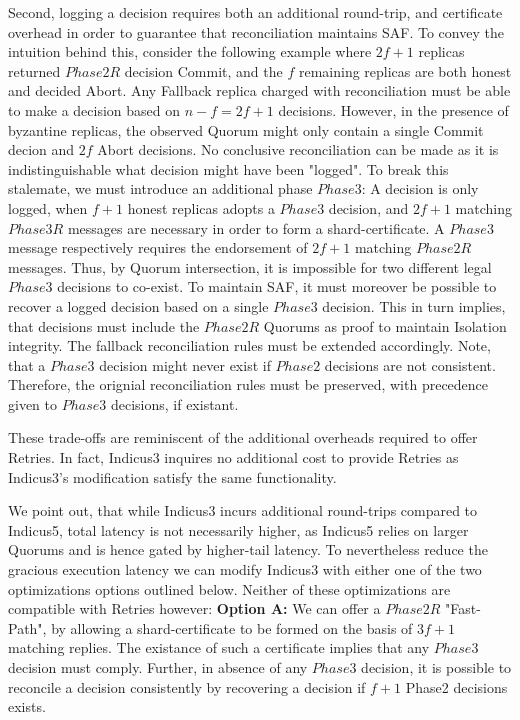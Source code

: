 Second, logging a decision requires both an additional round-trip, and certificate overhead in order to guarantee that reconciliation maintains SAF. To convey the intuition behind this, consider the following example where $2f+1$ replicas returned $Phase2R$ decision Commit, and the $f$ remaining replicas are both honest and decided Abort. Any Fallback replica charged with reconciliation must be able to make a decision based on $n-f = 2f+1$ decisions. However, in the presence of byzantine replicas, the observed Quorum might only contain a single Commit decion and $2f$ Abort decisions. No conclusive reconciliation can be made as it is indistinguishable what decision might have been "logged". To break this stalemate, we must introduce an additional phase $Phase3$: A decision is only logged, when $f+1$ honest replicas adopts a $Phase3$ decision, and $2f+1$ matching $Phase3R$ messages are necessary in order to form a shard-certificate. A $Phase3$ message respectively requires the endorsement of $2f+1$ matching $Phase2R$ messages. Thus, by Quorum intersection, it is impossible for two different legal $Phase3$ decisions to co-exist. To maintain SAF, it must moreover be possible to recover a logged decision based on a single $Phase3$ decision. This in turn implies, that decisions must include the $Phase2R$ Quorums as proof to maintain Isolation integrity. The fallback reconciliation rules must be extended accordingly. Note, that a $Phase3$ decision might never exist if $Phase2$ decisions are not consistent. Therefore, the orignial reconciliation rules must be preserved, with precedence given to $Phase3$ decisions, if existant.

These trade-offs are reminiscent of the additional overheads required to offer Retries. In fact, Indicus3 inquires no additional cost to provide Retries as Indicus3's modification satisfy the same functionality.

We point out, that while Indicus3 incurs additional round-trips compared to Indicus5, total latency is not necessarily higher, as Indicus5 relies on larger Quorums and is hence gated by higher-tail latency.
To nevertheless reduce the gracious execution latency we can modify Indicus3 with either one of the  two optimizations options outlined below. Neither of these optimizations are compatible with Retries however:
\textbf{Option A:} We can offer a $Phase2R$ "Fast-Path", by allowing a shard-certificate to be formed on the basis of $3f+1$ matching replies. The existance of such a certificate implies that any $Phase3$ decision must comply. Further, in absence of any $Phase3$ decision, it is possible to reconcile a decision consistently by recovering a decision if $f+1$ Phase2 decisions exists.


